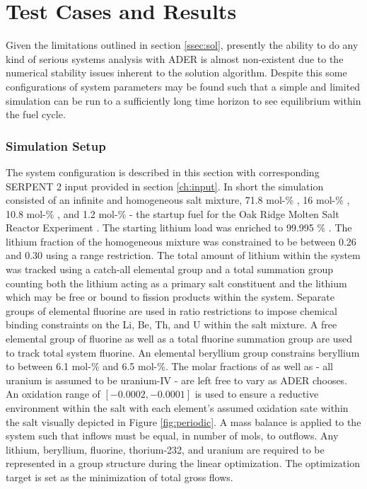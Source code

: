 \chapter{Test Cases and Results}
\label{ch:results}

Given the limitations outlined in section \ref{ssec:sol}, presently the ability
to do any kind of serious systems analysis with ADER is almost non-existent due
to the numerical stability issues inherent to the solution algorithm. Despite
this some configurations of system parameters may be found such that a simple
and limited simulation can be run to a sufficiently long time horizon to see
equilibrium within the fuel cycle.

\subsection{Simulation Setup}\label{ssec:setup}
The system configuration is described in this section with corresponding 
SERPENT 2
input provided in section \ref{ch:input}. In short the simulation consisted
of an infinite and homogeneous salt mixture, 71.8 mol-\% , 16 mol-\%
, 10.8 mol-\% , and 1.2 mol-\%  - the startup
fuel for the Oak Ridge Molten Salt Reactor Experiment \cite{ORNL}. The starting
lithium load was enriched to 99.995 \% . The lithium
fraction of the homogeneous mixture was constrained to be between 0.26 and 0.30
using a range restriction. The total amount of lithium within the system was
tracked using a catch-all elemental group and a total summation group counting
both the lithium acting as a primary salt constituent and the lithium which may
be free or bound to fission products within the system. Separate groups of
elemental fluorine are used in ratio restrictions to impose chemical binding 
constraints on the Li, Be, Th, and U within the salt mixture. A free elemental
group of fluorine as well as a total fluorine summation group are used to track
total system fluorine. An elemental beryllium group constrains beryllium to
between 6.1 mol-\% and 6.5 mol-\%. The molar fractions of  as well
as  - all uranium is assumed to be uranium-IV - are left free to vary
as ADER chooses. An oxidation range of $[-0.0002, -0.0001]$ is used to ensure
a reductive environment within the salt with each element's assumed oxidation
sate within the salt visually depicted in Figure \ref{fig:periodic}. 
A mass balance is applied to the
system such that inflows must be equal, in number of mols, to outflows. Any
lithium, beryllium, fluorine, thorium-232, and uranium are required to be
represented in a group structure during the linear optimization. The
optimization target is set as the minimization of total gross flows.

